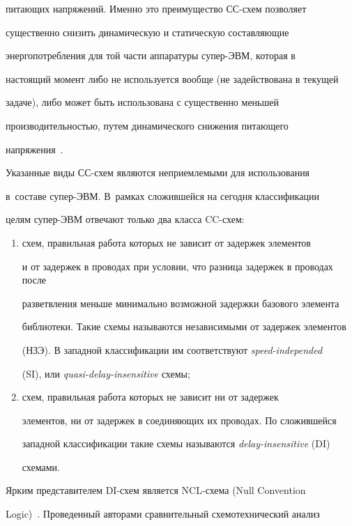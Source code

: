 питающих напряжений. Именно это преимущество СС-схем позволяет

существенно снизить динамическую и статическую составляющие

энергопотребления для той части аппаратуры су\-пер-ЭВМ, которая в

настоящий момент либо не используется вообще (не задействована в текущей

задаче), либо может быть использована с существенно меньшей

производительностью, путем динамического снижения питающего

напряжения~\cite{11-st1}.



      Указанные виды СС-схем являются неприемлемыми для использования

в~со\-ста\-ве су\-пер-ЭВМ. В~рамках сложившейся на сегодня классификации

целям су\-пер-ЭВМ отвечают только два класса CC-схем:

      \begin{enumerate}[(1)]

      \item схем, правильная работа которых не зависит от задержек элементов

и от задержек в проводах при условии, что разница задержек в проводах после

разветвления меньше минимально возможной задержки базового элемента

библиотеки. Такие схемы называются независимыми от задержек элементов

(НЗЭ). В западной классификации им соответствуют \textit{speed-independed}

(SI), или \textit{quasi-delay-insensitive} схемы;

      \item схем, правильная работа которых не зависит ни от задержек

элементов, ни от задержек в соединяющих их проводах. По сложившейся

западной классификации такие схемы называются \textit{delay-insensitive} (DI)

схемами.

      \end{enumerate}



      Ярким представителем DI-схем является NCL-схе\-ма (Null Convention

Logic)~\cite{12-st1}. Проведенный авторами сравнительный схемотехнический анализ

